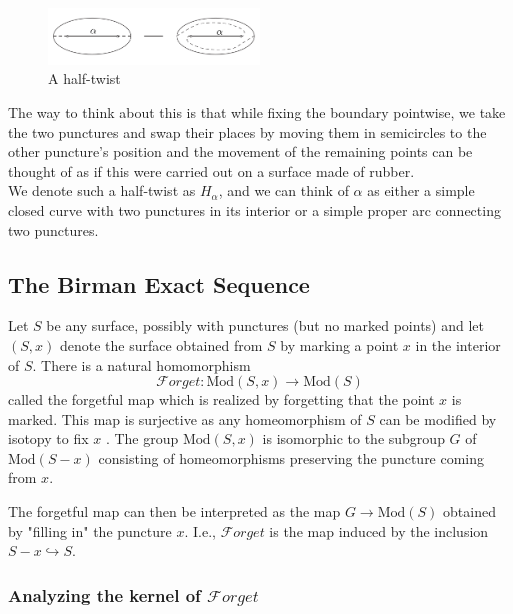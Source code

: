 \documentclass[reqno]{amsart}
\theoremstyle{definition}
\theoremstyle{remark}
\newcommand{\Mod}{{\mathrm{Mod}}}
\newcommand{\Forget}{{\mathcal{F}}orget}
\begin{document}
\begin{figure}[htpb]
    \centering
    \includegraphics[width=0.5\textwidth]{half-twist.png}
    \caption{A half-twist}
    \label{fig:half-twist-png}
\end{figure}

The way to think about this is that while fixing the boundary
pointwise, we take the two punctures and swap their places
by moving them in semicircles to the other puncture's position and
the movement of the remaining points can be
thought of as if this were carried out on
a surface made of rubber.\\


We denote such a half-twist as $H_{\alpha}$, and we
can think of $\alpha$ as either a simple closed
curve with two punctures in its interior or a simple
proper arc connecting two punctures.


\subsection{The Birman Exact Sequence}

Let $S$ be any surface, possibly with punctures (but no 
marked points) and let
$\left( S, x \right) $ denote the surface obtained
from $S$ by marking a point $x$ in the
interior of $S$. There is a natural
homomorphism
\[
\Forget \colon \Mod \left( S, x \right) \to \Mod(S)
\] 
called the forgetful map which is realized by forgetting
that the point $x$ is marked. This map is
surjective as any homeomorphism of $S$ can
be modified by isotopy to fix $x$ . The
group $\Mod(S,x)$ is isomorphic to the
subgroup $G$ of $\Mod \left( S - x \right) $ 
consisting of homeomorphisms preserving the
puncture coming from $x$.

The forgetful map can then be interpreted
as the map $G \to \Mod(S)$ obtained by "filling in" the
puncture $x$. I.e., $\Forget$ is the map
induced by the inclusion
 $S -x \hookrightarrow S$.



 

 \subsubsection{Analyzing the kernel of $\Forget$}
\end{document}
